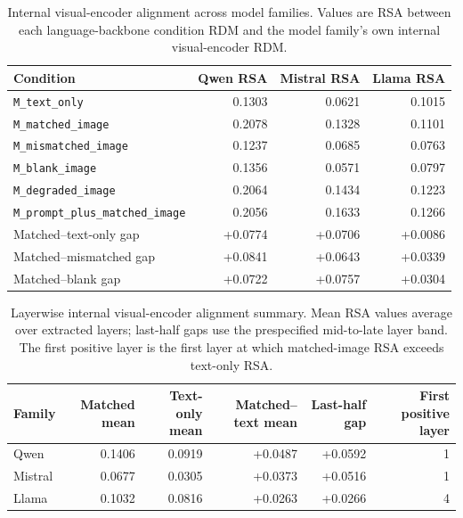 \documentclass{article}
\begin{document}
\begin{table}[!htbp]
\centering
\caption{Internal visual-encoder alignment across model families. Values are RSA between each language-backbone condition RDM and the model family's own internal visual-encoder RDM.}
\label{tab:appendix_internal_visual_encoder}
\small
\begin{tabular}{lrrr}
  \toprule
  Condition & Qwen RSA & Mistral RSA & Llama RSA \\
  \midrule
  \texttt{M\_text\_only} & 0.1303 & 0.0621 & 0.1015 \\
  \texttt{M\_matched\_image} & 0.2078 & 0.1328 & 0.1101 \\
  \texttt{M\_mismatched\_image} & 0.1237 & 0.0685 & 0.0763 \\
  \texttt{M\_blank\_image} & 0.1356 & 0.0571 & 0.0797 \\
  \texttt{M\_degraded\_image} & 0.2064 & 0.1434 & 0.1223 \\
  \texttt{M\_prompt\_plus\_matched\_image} & 0.2056 & 0.1633 & 0.1266 \\
  \midrule
  Matched--text-only gap & +0.0774 & +0.0706 & +0.0086 \\
  Matched--mismatched gap & +0.0841 & +0.0643 & +0.0339 \\
  Matched--blank gap & +0.0722 & +0.0757 & +0.0304 \\
  \bottomrule
\end{tabular}
\end{table}

\begin{table}[!htbp]
\centering
\caption{Layerwise internal visual-encoder alignment summary. Mean RSA values average over extracted layers; last-half gaps use the prespecified mid-to-late layer band. The first positive layer is the first layer at which matched-image RSA exceeds text-only RSA.}
\label{tab:appendix_layerwise_internal_visual_encoder}
\small
\begin{tabular}{lrrrrr}
  \toprule
  Family & Matched mean & Text-only mean & Matched--text mean & Last-half gap & First positive layer \\
  \midrule
  Qwen & 0.1406 & 0.0919 & +0.0487 & +0.0592 & 1 \\
  Mistral & 0.0677 & 0.0305 & +0.0373 & +0.0516 & 1 \\
  Llama & 0.1032 & 0.0816 & +0.0263 & +0.0266 & 4 \\
  \bottomrule
\end{tabular}
\end{table}
\end{document}

